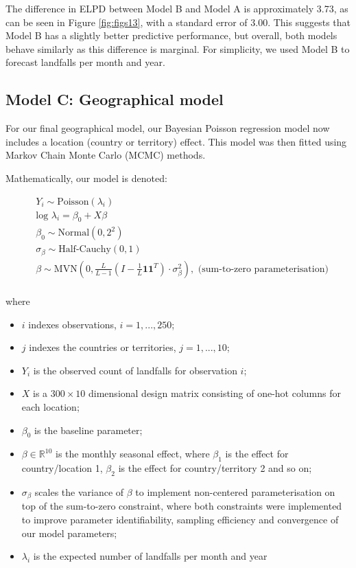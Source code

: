 \documentclass[
]{article}
\providecommand{\tightlist}{%
  \setlength{\itemsep}{0pt}\setlength{\parskip}{0pt}}
\begin{document}
The difference in ELPD between Model B and Model A is approximately 3.73, as can be seen in Figure \ref{fig:figs13}, with a standard error of 3.00. This suggests that Model B has a slightly better predictive performance, but overall, both models behave similarly as this difference is marginal. For simplicity, we used Model B to forecast landfalls per month and year.

\subsection{Model C: Geographical model}\label{model-c-geographical-model}

For our final geographical model, our Bayesian Poisson regression model now includes a location (country or territory) effect. This model was then fitted using Markov Chain Monte Carlo (MCMC) methods.

Mathematically, our model is denoted:

\begin{align*}
&Y_{i} \sim \text{Poisson}(\lambda_{i})\\
&\text{log } \lambda_{i} =  \beta_0 + X \beta\\
&\beta_0 \sim \text{Normal}(0,2^2)\\
&\sigma_{\beta} \sim \text{Half-Cauchy}(0,1)\\
&\beta \sim \text{MVN}( 0, \frac{L}{L-1}( I - \frac{1}{L} \mathbf{1}\mathbf{1}^T) \cdot \sigma_{\beta}^2), \text{ (sum-to-zero parameterisation)}\\
\end{align*}

where

\begin{itemize}
\tightlist
\item
  \(i\) indexes observations, \(i=1,...,250\);
\item
  \(j\) indexes the countries or territories, \(j = 1,...,10\);
\item
  \(Y_{i}\) is the observed count of landfalls for observation \(i\);
\item
  \(X\) is a \(300 \times 10\) dimensional design matrix consisting of one-hot columns for each location;
\item
  \(\beta_0\) is the baseline parameter;
\item
  \(\beta \in \mathbb{R}^{10}\) is the monthly seasonal effect, where \(\beta_1\) is the effect for country/location 1, \(\beta_2\) is the effect for country/territory 2 and so on;
\item
  \(\sigma_{\beta}\) scales the variance of \(\beta\) to implement non-centered parameterisation on top of the sum-to-zero constraint, where both constraints were implemented to improve parameter identifiability, sampling efficiency and convergence of our model parameters;
\item
  \(\lambda_{i}\) is the expected number of landfalls per month and year
\end{itemize}
\end{document}
